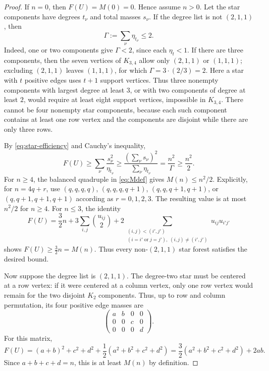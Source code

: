 \documentclass[12pt]{article}
\theoremstyle{plain}
\theoremstyle{definition}
\theoremstyle{remark}
\begin{document}
\begin{proof}
If \(n=0\), then \(F(U)=M(0)=0\).  Hence assume \(n>0\).  Let the star
components have degrees \(t_\nu\) and total masses \(s_\nu\).  If the degree
list is not \((2,1,1)\), then
\begin{equation}\label{eq:Gamma-bound}
  \Gamma:=\sum_\nu \eta_{t_\nu}\le2.
\end{equation}
Indeed, one or two components give \(\Gamma<2\), since each \(\eta_t<1\).  If
there are three components, then the seven vertices of \(K_{3,4}\) allow only
\((2,1,1)\) or \((1,1,1)\); excluding \((2,1,1)\) leaves \((1,1,1)\), for
which \(\Gamma=3\cdot(2/3)=2\).  Here a star with \(t\) positive edges uses
\(t+1\) support vertices.  Thus three nonempty components with largest degree
at least \(3\), or with two components of degree at least \(2\), would require
at least eight support vertices, impossible in \(K_{3,4}\).  There cannot be
four nonempty star components, because each such component contains at least
one row vertex and the components are disjoint while there are only three
rows.

By \eqref{eq:star-efficiency} and Cauchy's inequality,
\[
  F(U)\ge\sum_\nu\frac{s_\nu^2}{\eta_{t_\nu}}
  \ge\frac{(\sum_\nu s_\nu)^2}{\sum_\nu\eta_{t_\nu}}
  =\frac{n^2}{\Gamma}
  \ge\frac{n^2}{2}.
\]
For \(n\ge4\), the balanced quadruple in \eqref{eq:Mdef} gives
\(M(n)\le n^2/2\).  Explicitly, for \(n=4q+r\), use
\((q,q,q,q)\), \((q,q,q,q+1)\), \((q,q,q+1,q+1)\), or
\((q,q+1,q+1,q+1)\) according as \(r=0,1,2,3\).  The resulting value is at
most \(n^2/2\) for \(n\ge4\).  For \(n\le3\), the identity
\[
  F(U)=\frac32n
      +3\sum_{i,j}\binom{u_{ij}}2
      +2\sum_{\substack{(i,j)<(i',j')\\
             (i=i'\;\text{or}\;j=j'),\;(i,j)\ne(i',j')}}u_{ij}u_{i'j'}
\]
shows \(F(U)\ge\frac32n=M(n)\).  Thus every non-\((2,1,1)\) star forest
satisfies the desired bound.

Now suppose the degree list is \((2,1,1)\).  The degree-two star must be
centered at a row vertex: if it were centered at a column vertex, only one row
vertex would remain for the two disjoint \(K_2\) components.  Thus, up to row
and column permutation, its four positive edge masses are
\[
  \begin{pmatrix}
  a&b&0&0\\
  0&0&c&0\\
  0&0&0&d
  \end{pmatrix}.
\]
For this matrix,
\[
  F(U)=(a+b)^2+c^2+d^2+\frac12(a^2+b^2+c^2+d^2)
  =\frac32(a^2+b^2+c^2+d^2)+2ab.
\]
Since \(a+b+c+d=n\), this is at least \(M(n)\) by definition.
\end{proof}
\end{document}
